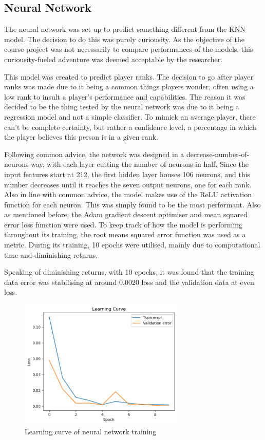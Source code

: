 \documentclass[12pt]{article}
\begin{document}
\subsection{Neural Network}
The neural network was set up to predict something different from the KNN model.
The decision to do this was purely curiousity.
As the objective of the course project was not necessarily to compare performances of the models, this curiousity-fueled adventure was deemed acceptable by the researcher.

This model was created to predict player ranks.
The decision to go after player ranks was made due to it being a common things players wonder, often using a low rank to insult a player's performance and capabilities.
The reason it was decided to be the thing tested by the neural network was due to it being a regression model and not a simple classifier.
To mimick an average player, there can't be complete certainty, but rather a confidence level, a percentage in which the player believes this person is in a given rank.

Following common advice, the network was designed in a decrease-number-of-neurons way, with each layer cutting the number of neurons in half.
Since the input features start at 212, the first hidden layer houses 106 neurons, and this number decreases until it reaches the seven output neurons, one for each rank.
Also in line with common advice, the model makes use of the ReLU activation function for each neuron.
This was simply found to be the most performant.
Also as mentioned before, the Adam gradient descent optimiser and mean squared error loss function were used.
To keep track of how the model is performing throughout its training, the root means squared error function was used as a metric.
During its training, 10 epochs were utilised, mainly due to computational time and diminishing returns.

Speaking of diminishing returns, with 10 epochs, it was found that the training data error was stabilising at around 0.0020 loss and the validation data at even less.
\begin{figure}[H]
	\centering
	\includegraphics[width=0.7\textwidth]{nn-learning-curve}
	\caption{Learning curve of neural network training}
	\label{fig:nn-learning-curve}
\end{figure}
\end{document}
